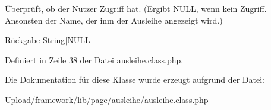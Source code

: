 Überprüft, ob der Nutzer Zugriff hat. (Ergibt N\+U\+LL, wenn kein Zugriff. Ansonsten der Name, der inm der Ausleihe angezeigt wird.) \begin{DoxyReturn}{Rückgabe}
String$\vert$\+N\+U\+LL 
\end{DoxyReturn}


Definiert in Zeile 38 der Datei ausleihe.\+class.\+php.



Die Dokumentation für diese Klasse wurde erzeugt aufgrund der Datei\+:\begin{DoxyCompactItemize}
\item 
Upload/framework/lib/page/ausleihe/ausleihe.\+class.\+php\end{DoxyCompactItemize}
